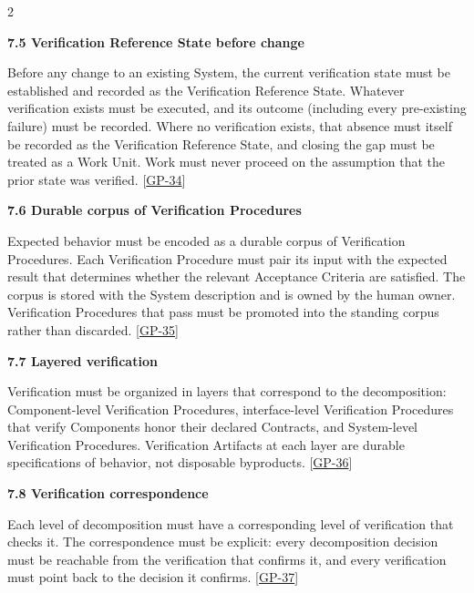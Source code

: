 \begin{multicols}{2}
\hypertarget{nss-7.5}{}

\par\smallskip\noindent\textbf{7.5 Verification Reference State before change}\par\nopagebreak

Before any change to an existing System, the current verification state must be established and recorded as the Verification Reference State. Whatever verification exists must be executed, and its outcome (including every pre-existing failure) must be recorded. Where no verification exists, that absence must itself be recorded as the Verification Reference State, and closing the gap must be treated as a Work Unit. Work must never proceed on the assumption that the prior state was verified. [\hyperlink{gp-34}{GP-34}]

\hypertarget{nss-7.6}{}

\par\smallskip\noindent\textbf{7.6 Durable corpus of Verification Procedures}\par\nopagebreak

Expected behavior must be encoded as a durable corpus of Verification Procedures. Each Verification Procedure must pair its input with the expected result that determines whether the relevant Acceptance Criteria are satisfied. The corpus is stored with the System description and is owned by the human owner. Verification Procedures that pass must be promoted into the standing corpus rather than discarded. [\hyperlink{gp-35}{GP-35}]

\hypertarget{nss-7.7}{}

\par\smallskip\noindent\textbf{7.7 Layered verification}\par\nopagebreak

Verification must be organized in layers that correspond to the decomposition: Component-level Verification Procedures, interface-level Verification Procedures that verify Components honor their declared Contracts, and System-level Verification Procedures. Verification Artifacts at each layer are durable specifications of behavior, not disposable byproducts. [\hyperlink{gp-36}{GP-36}]

\hypertarget{nss-7.8}{}

\par\smallskip\noindent\textbf{7.8 Verification correspondence}\par\nopagebreak

Each level of decomposition must have a corresponding level of verification that checks it. The correspondence must be explicit: every decomposition decision must be reachable from the verification that confirms it, and every verification must point back to the decision it confirms. [\hyperlink{gp-37}{GP-37}]


\end{multicols}
